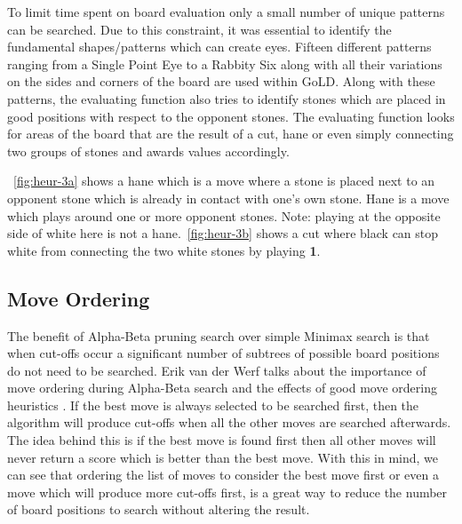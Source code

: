 \documentclass{l4proj}
\newcommand{\bo}[1]{\textbf{#1}}
\begin{document}
To limit time spent on board evaluation only a small number of unique patterns can be searched. Due to this constraint, it was essential to identify the fundamental shapes/patterns which can create eyes. Fifteen different patterns ranging from a Single Point Eye to a Rabbity Six along with all their variations on the sides and corners of the board are used within GoLD.  Along with these patterns, the evaluating function also tries to identify stones which are placed in good positions with respect to the opponent stones. The evaluating function looks for areas of the board that are the result of a cut, hane or even simply connecting two groups of stones and awards values accordingly.


~\autoref{fig:heur-3a} shows a hane which is a move where a stone is placed next to an opponent stone which is already in contact with one’s own stone. Hane is a move which plays around one or more opponent stones. Note: playing at the opposite side of white here is not a hane.~\autoref{fig:heur-3b} shows a cut where black can stop white from connecting the two white stones by playing \bo{1}.





\subsection{Move Ordering}
The benefit of Alpha-Beta pruning search over simple Minimax search is that when cut-offs occur a significant number of subtrees of possible board positions do not need to be searched. Erik van der Werf talks about the importance of move ordering during Alpha-Beta search and the effects of good move ordering heuristics \cite{ErikvanderWerf2004}. If the best move is always selected to be searched first, then the algorithm will produce cut-offs when all the other moves are searched afterwards. The idea behind this is if the best move is found first then all other moves will never return a score which is better than the best move. With this in mind, we can see that ordering the list of moves to consider the best move first or even a move which will produce more cut-offs first, is a great way to reduce the number of board positions to search without altering the result.
\end{document}
